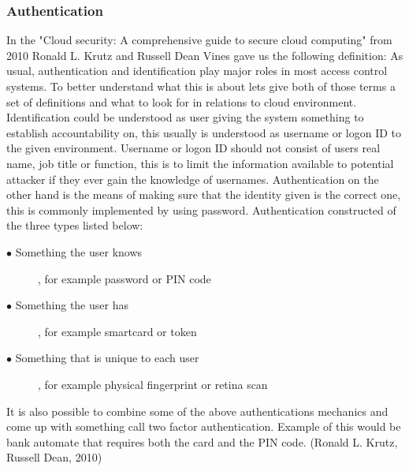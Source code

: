 \documentclass{article}
\begin{document}
\subsubsection{Authentication}
In the "Cloud security: A comprehensive guide to secure cloud computing" from 2010 Ronald L. Krutz and Russell Dean Vines gave us the following definition: As usual, authentication and identification play major roles in most access control systems. To better understand what this is about lets give both of those terms a set of definitions and what to look for in relations to cloud environment.
Identification could be understood as user giving the system something to establish accountability on, this usually is understood as username or logon ID to the given environment. Username or logon ID should not consist of users real name, job title or function, this is to limit the information available to potential attacker if they ever gain the knowledge of usernames. Authentication on the other hand is the means of making sure that the identity given is the correct one, this is commonly implemented by using password. Authentication constructed of the three types listed below:
\begin{description}
        \item[$\bullet$ Something the user knows], for example password or PIN code
        \item[$\bullet$ Something the user has], for example smartcard or token
        \item[$\bullet$ Something that is unique to each user], for example physical fingerprint or retina scan
\end{description}
It is also possible to combine some of the above authentications mechanics and come up with something call two factor authentication. Example of this would be bank automate that requires both the card and the PIN code. (Ronald L. Krutz, Russell Dean, 2010)
\end{document}
